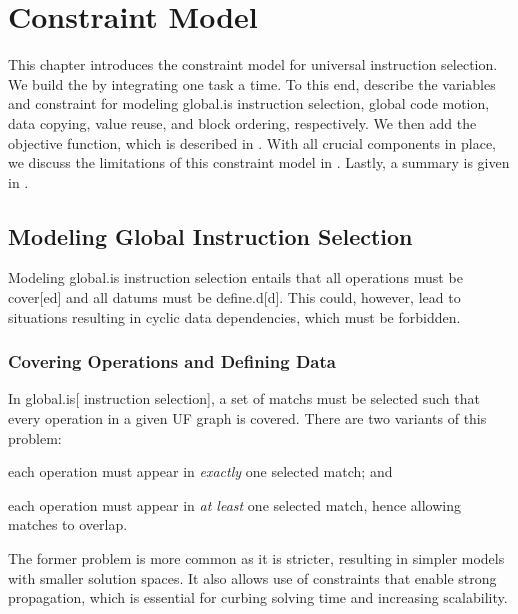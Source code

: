 %

\chapter{Constraint Model}

This chapter introduces the \gls{constraint model} for \gls{universal
  instruction selection}.
%
We build the  by integrating one task a time.
%
To this end,
describe the \glspl{variable} and \gls{constraint} for modeling \gls{global.is}
\gls{instruction selection}, \gls{global code motion}, \gls{data copying},
\gls{value reuse}, and \gls{block ordering}, respectively.
%
We then add the \gls{objective function}, which is described in
.
%
With all crucial components in place, we discuss the limitations of this
\gls{constraint model} in .
%
Lastly, a summary is given in .


\section{Modeling Global Instruction Selection}

Modeling \gls{global.is} \gls{instruction selection} entails that all
\glspl{operation} must be \gls{cover}[ed] and all \glspl{datum} must be
\gls{define.d}[d].
%
This could, however, lead to situations resulting in cyclic data dependencies,
which must be forbidden.


\subsection{Covering Operations and Defining Data}

In \gls{global.is}[ \gls{instruction selection}], a set of \glspl{match} must be
selected such that every \gls{operation} in a given \gls{UF graph} is covered.
%
There are two variants of this problem:
%
\begin{enumerate*}[label=(\arabic*)]
  \item each \gls{operation} must appear in \emph{exactly} one selected
    \gls{match}; and
%
  \item each \gls{operation} must appear in \emph{at least} one selected
    \gls{match}, hence allowing matches to \gls{overlap}.
\end{enumerate*}
%
The former problem is more common as it is stricter, resulting in simpler models
with smaller \glspl{solution space}.
%
It also allows use of \glspl{constraint} that enable strong \gls{propagation},
which is essential for curbing solving time and increasing scalability.

